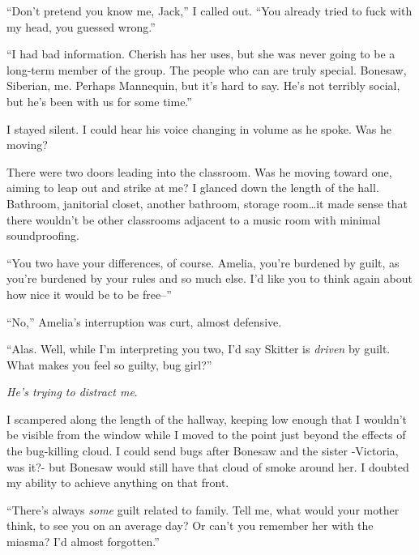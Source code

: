 ``Don't pretend you know me, Jack,'' I called out.  ``You already tried to fuck with my head, you guessed wrong.''



``I had bad information.  Cherish has her uses, but she was never going to be a long-term member of the group.  The people who can are truly special.  Bonesaw, Siberian, me.  Perhaps Mannequin, but it's hard to say.  He's not terribly social, but he's been with us for some time.''



I stayed silent.  I could hear his voice changing in volume as he spoke.  Was he moving?



There were two doors leading into the classroom.  Was he moving toward one, aiming to leap out and strike at me?  I glanced down the length of the hall.  Bathroom, janitorial closet, another bathroom, storage room\ldots it made sense that there wouldn't be other classrooms adjacent to a music room with minimal soundproofing.



``You two have your differences, of course.  Amelia, you're burdened by guilt, as you're burdened by your rules and so much else.  I'd like you to think again about how nice it would be to be free--''



``No,'' Amelia's interruption was curt, almost defensive.



``Alas.  Well, while I'm interpreting you two, I'd say Skitter is \emph{driven} by guilt.  What makes you feel so guilty, bug girl?''



\emph{He's trying to distract me}.



I scampered along the length of the hallway, keeping low enough that I wouldn't be visible from the window while I moved to the point just beyond the effects of the bug-killing cloud.  I could send bugs after Bonesaw and the sister -Victoria, was it?- but Bonesaw would still have that cloud of smoke around her.  I doubted my ability to achieve anything on that front.



``There's always \emph{some} guilt related to family.  Tell me, what would your mother think, to see you on an average day?  Or can't you remember her with the miasma?  I'd almost forgotten.''



